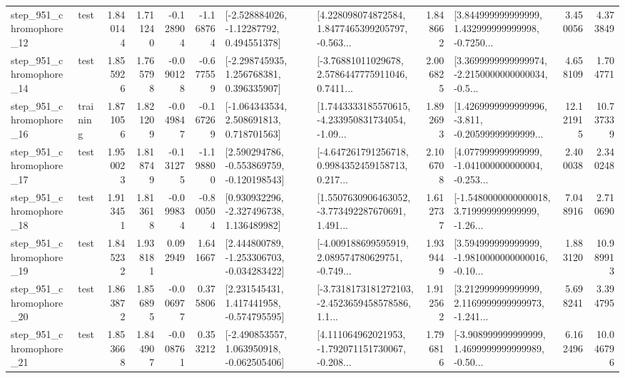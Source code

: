 \begin{tabular}{llrrrrllrlrr}
  step\_951\_chromophore\_12 &      test &      1.840144 &    1.711240 &     -0.128904 & -1.168764 &    [-2.528884026, -1.12287792, 0.494551378] &  [4.228098074872584, 1.8477465399205797, -0.563... &       1.848662 &  [3.844999999999999, 1.432999999999998, -0.7250... &            3.450056 &          4.373849 \\
  step\_951\_chromophore\_14 &      test &      1.855926 &    1.765798 &     -0.090128 & -0.677559 &    [-2.298745935, 1.256768381, 0.396335907] &  [-3.76881011029678, 2.5786447775911046, 0.7411... &       2.006825 &  [3.3699999999999974, -2.2150000000000034, -0.5... &            4.658109 &          1.704771 \\
  step\_951\_chromophore\_16 &  training &      1.871056 &    1.821209 &     -0.049847 & -0.167269 &    [-1.064343534, 2.508691813, 0.718701563] &  [1.7443333185570615, -4.233950831734054, -1.09... &       1.892693 &  [1.4269999999999996, -3.811, -0.20599999999999... &           12.121915 &         10.737339 \\
  step\_951\_chromophore\_17 &      test &      1.950023 &    1.818749 &     -0.131275 & -1.198800 &   [2.590294786, -0.553869759, -0.120198543] &  [-4.647261791256718, 0.9984352459158713, 0.217... &       2.106708 &  [4.077999999999999, -1.041000000000004, -0.253... &            2.400038 &          2.340248 \\
  step\_951\_chromophore\_18 &      test &      1.913451 &    1.813618 &     -0.099834 & -0.800504 &    [0.930932296, -2.327496738, 1.136489982] &  [1.5507630906463052, -3.773492287670691, 1.491... &       1.612737 &  [-1.5480000000000018, 3.719999999999999, -1.26... &            7.048916 &          2.710690 \\
  step\_951\_chromophore\_19 &      test &      1.845232 &    1.938181 &      0.092949 &  1.641667 &   [2.444800789, -1.253306703, -0.034283422] &  [-4.009188699595919, 2.089574780629751, -0.749... &       1.939449 &  [3.594999999999999, -1.9810000000000016, -0.10... &            1.883120 &         10.989913 \\
  step\_951\_chromophore\_20 &      test &      1.863872 &    1.856895 &     -0.006977 &  0.375806 &    [2.231545431, 1.417441958, -0.574795595] &  [-3.7318173181272103, -2.4523659458578586, 1.1... &       1.912562 &  [3.212999999999999, 2.1169999999999973, -1.241... &            5.698241 &          3.394795 \\
  step\_951\_chromophore\_21 &      test &      1.853668 &    1.844907 &     -0.008761 &  0.353212 &   [-2.490853557, 1.063950918, -0.062505406] &  [4.111064962021953, -1.792071151730067, -0.208... &       1.796816 &  [-3.908999999999999, 1.4699999999999989, -0.50... &            6.162496 &         10.046796 \\

\end{tabular}
